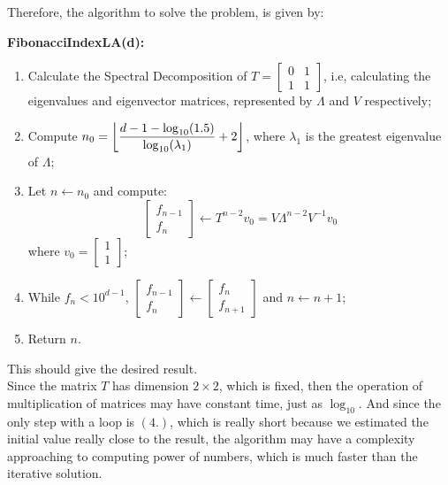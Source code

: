 \documentclass{article}
\DeclarePairedDelimiter\floor{\lfloor}{\rfloor}
\begin{document}
Therefore, the algorithm to solve the problem, is given by:
\vspace{1cm}

\textbf{FibonacciIndexLA(d):}
\begin{enumerate}
    \item Calculate the Spectral Decomposition of $T = \begin{bmatrix}
        0 & 1\\
        1 & 1
    \end{bmatrix}$, i.e, calculating the eigenvalues and eigenvector matrices,
    represented by $\Lambda$ and $V$ respectively;
    \item Compute $n_0 = \floor*{\dfrac{d  - 1- \log_{10}(1.5)}{\log_{10}(\lambda_1)} + 2}$,
    where  $\lambda_1$ is the greatest eigenvalue of $\Lambda$;
    \item Let $n \leftarrow n_0$ and compute:
    \begin{equation*}
        \begin{bmatrix}
            f_{n-1}\\
            f_n
        \end{bmatrix} \leftarrow T^{n-2}v_0 = V \Lambda^{n-2} V^{-1} v_0
    \end{equation*} where $v_0 = \begin{bmatrix}
        1 \\
        1
    \end{bmatrix}$;
    \item While $f_n < 10^{d - 1}$, $\begin{bmatrix}
        f_{n-1}\\
        f_{n}
    \end{bmatrix} \leftarrow \begin{bmatrix}
        f_n\\
        f_{n+1}
    \end{bmatrix}$ and $n \leftarrow n + 1$;
    \item Return $n$.
\end{enumerate}
\vspace{1cm}

This should give the desired result.\\

Since the matrix $T$ has dimension $2 \times 2$, which is fixed, then
the operation of multiplication of matrices may have constant time, just as
$\log_{10}$. And since the only step with a loop is
$(4.)$, which is really short because we estimated the initial value really
close to the result, the algorithm may have a complexity approaching
to computing power of numbers, which is much faster than the iterative
solution.
\end{document}

